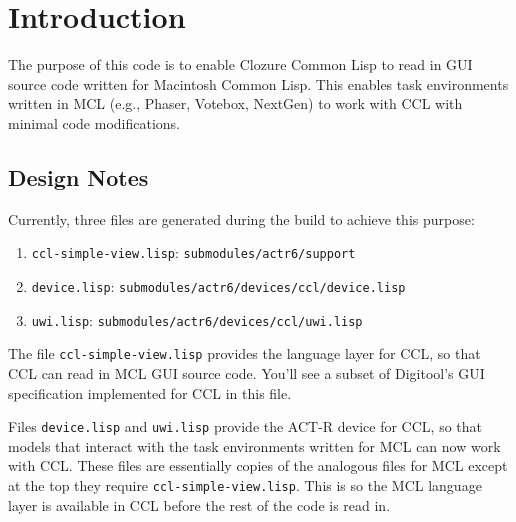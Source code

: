 \documentclass[12pt]{article} %
\newcommand{\filesys}[1]{\texttt{#1}}
\begin{document}

\tableofcontents %

\newpage %


\section{Introduction} %

The purpose of this code is to enable Clozure Common Lisp to read in GUI source code written for Macintosh Common Lisp.
This enables task environments written in MCL (e.g., Phaser, Votebox, NextGen) to work with CCL with minimal code modifications. 

\subsection{Design Notes}

Currently, three files are generated during the build to achieve this purpose:

\begin{enumerate}[topsep=12pt]
  \item \filesys{ccl-simple-view.lisp}: \filesys{submodules/actr6/support}
  \item \filesys{device.lisp}: \filesys{submodules/actr6/devices/ccl/device.lisp}
  \item \filesys{uwi.lisp}: \filesys{submodules/actr6/devices/ccl/uwi.lisp}
\end{enumerate}

The file \filesys{ccl-simple-view.lisp} provides the language layer for CCL, so that CCL can read in MCL GUI source code.
You'll see a subset of Digitool's GUI specification implemented for CCL in this file.

Files \filesys{device.lisp} and \filesys{uwi.lisp} provide the ACT-R device for CCL, so that models that interact with the task environments written for MCL can now work with CCL.
These files are essentially copies of the analogous files for MCL except at the top they require \filesys{ccl-simple-view.lisp}.
This is so the MCL language layer is available in CCL before the rest of the code is read in.
\end{document}
